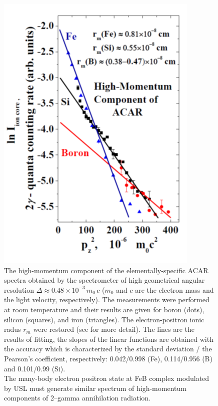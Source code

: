 \documentclass{ttp}
\begin{document}
\begin{figure}
	\centering
     \includegraphics[width=\linewidth]{Fig6.png}
	  \caption{The high-momentum component of the elementally-specific ACAR spectra
        obtained by the spectrometer of high geometrical angular resolution $\Delta \approx 0.48 \times 10^{-3}\,m_0\,c$
        ($m_0$ and $c$ are the electron mass and the light velocity, respectively).
        The measurements were performed at room temperature and their results are given
        for boron (dots), silicon (squares), and iron (triangles).
        The electron-positron ionic radus $r_m$ were restored (see \cite{Arutyunov2016,Arutyunov2006,Arutyunov2008} for more detail).
        The lines are the results of fitting, the slopes of the linear functions are obtained with the accuracy
        which is characterized by the standard deviation / the Pearson’s coefficient, respectively:
        0.042/0.998 (Fe), 0.114/0.956 (B) and 0.101/0.99 (Si).\\
        The many-body electron positron state at FeB complex modulated by USL must generate 
        similar spectrum of high-momentum components of 2–gamma annihilation radiation. 
}\label{fig6}
\end{figure}
\end{document}
